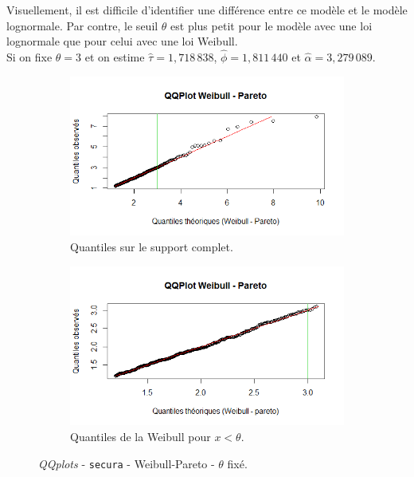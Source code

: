 		Visuellement, il est difficile d'identifier une différence entre ce modèle et le modèle lognormale. Par contre, le seuil $\theta$ est plus petit pour le modèle avec une loi lognormale que pour celui avec une loi Weibull. \\
		
		Si on fixe $\theta = 3$ et on estime $\hat{\tau} =1,718\,838$, $\hat{\phi}=1,811\,440$ et $\hat{\alpha} = 3,279\,089$.
		
		\begin{figure}[H]
			\begin{center}
				\begin{subfigure}[b]{0.45\textwidth}
					\includegraphics[scale=0.55]{Graphiques/QQ_Wei_pa_choix_secura} 
					\caption{Quantiles sur le support complet.} \label{QQplot_Wei_pa_choix_secura}
				\end{subfigure}
				\begin{subfigure}[b]{0.4\textwidth}
					\includegraphics[scale=0.55]{Graphiques/QQ_Wei_pa_choix_t1_secura} 
					\caption{Quantiles de la Weibull pour $x < \theta$.} \label{QQplot_Wei_pa_choix_2_secura}
				\end{subfigure}
				\renewcommand{\figurename}{Illustration}
				\caption{\textit{QQplots} - \texttt{secura} - Weibull-Pareto - $\theta$ fixé.}
			\end{center}
		\end{figure}
	
